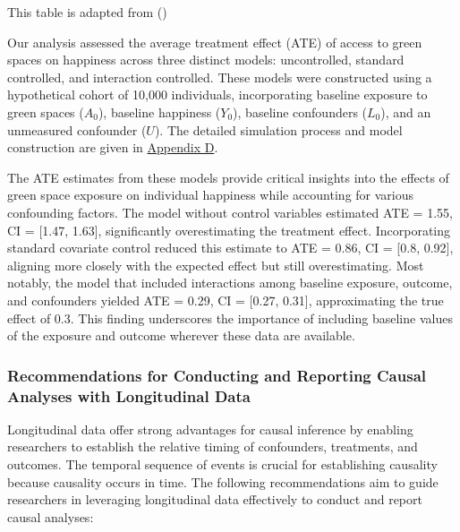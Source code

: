\documentclass[
  singlecolumn]{article}
\begin{document}
\begin{table}

\caption{\label{tbl-lg}This table is adapted from
()}

\centering{

\examplelongitudinal

}

\end{table}%

Our analysis assessed the average treatment effect (ATE) of access to
green spaces on happiness across three distinct models: uncontrolled,
standard controlled, and interaction controlled. These models were
constructed using a hypothetical cohort of 10,000 individuals,
incorporating baseline exposure to green spaces (\(A_0\)), baseline
happiness (\(Y_0\)), baseline confounders (\(L_0\)), and an unmeasured
confounder (\(U\)). The detailed simulation process and model
construction are given in
\hyperref[appendix-simulate-longitudinal-ate]{Appendix D}.

The ATE estimates from these models provide critical insights into the
effects of green space exposure on individual happiness while accounting
for various confounding factors. The model without control variables
estimated ATE = 1.55, CI = {[}1.47, 1.63{]}, significantly
overestimating the treatment effect. Incorporating standard covariate
control reduced this estimate to ATE = 0.86, CI = {[}0.8, 0.92{]},
aligning more closely with the expected effect but still overestimating.
Most notably, the model that included interactions among baseline
exposure, outcome, and confounders yielded ATE = 0.29, CI = {[}0.27,
0.31{]}, approximating the true effect of 0.3. This finding underscores
the importance of including baseline values of the exposure and outcome
wherever these data are available.

\subsubsection{Recommendations for Conducting and Reporting Causal
Analyses with Longitudinal
Data}\label{recommendations-for-conducting-and-reporting-causal-analyses-with-longitudinal-data}

Longitudinal data offer strong advantages for causal inference by
enabling researchers to establish the relative timing of confounders,
treatments, and outcomes. The temporal sequence of events is crucial for
establishing causality because causality occurs in time. The following
recommendations aim to guide researchers in leveraging longitudinal data
effectively to conduct and report causal analyses:
\end{document}

